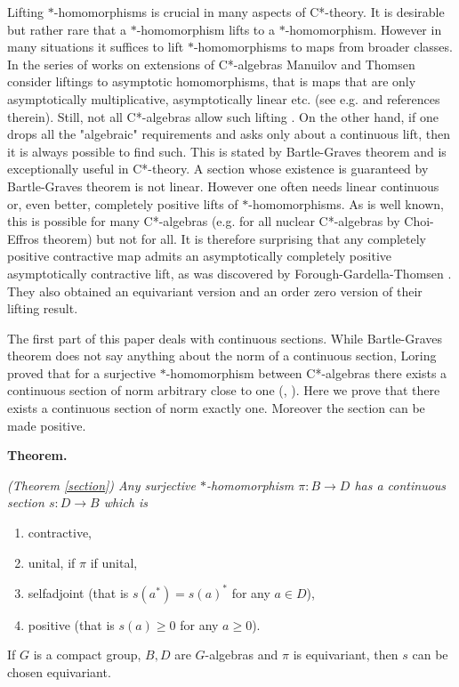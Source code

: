 \documentclass{article}%
\begin{document}
Lifting $\ast$-homomorphisms is crucial in many aspects of  C*-theory.  It is desirable but rather rare that a $\ast$-homomorphism lifts to a $\ast$-homomorphism. However in many situations it suffices to lift $\ast$-homomorphisms to maps from broader classes. In the series of works on extensions of C*-algebras Manuilov and Thomsen consider liftings to asymptotic homomorphisms, that is maps that are only asymptotically multiplicative, asymptotically linear etc. (see e.g. \cite{MT15} and references therein).  Still, not all C*-algebras allow such lifting \cite{MT2}.  On the other hand, if one drops all the "algebraic" requirements and asks only about a continuous lift, then it is always possible to find such. This is stated by  Bartle-Graves theorem and is exceptionally useful in C*-theory. A section whose existence is guaranteed by Bartle-Graves theorem is not linear. However  one often needs linear continuous or, even better,  completely positive lifts of $\ast$-homomorphisms. As is well known, this is possible for  many C*-algebras (e.g. for all nuclear C*-algebras by Choi-Effros theorem) but not for all. It is therefore surprising that any completely positive contractive map admits an asymptotically completely positive asymptotically contractive lift, as was discovered by Forough-Gardella-Thomsen \cite{FGT}. They also obtained an equivariant version and  an order zero version of their lifting result.

\medskip

The first part of this paper deals with continuous sections. While Bartle-Graves theorem does not say anything about the norm of a continuous section,  Loring proved  that for a surjective $\ast$-homomorphism between C*-algebras there exists a continuous section of norm arbitrary close to one (\cite{LoringSection}, \cite[Th. 3.2]{Manuilov}). Here we prove that there exists a continuous section of norm exactly one. Moreover the section can be made positive.

\medskip

{\bf Theorem.} {\it (Theorem \ref{section}) Any surjective $\ast$-homomorphism $\pi: B \to D$ has a continuous section $s: D \to B$ which is
\begin{enumerate}

\item  contractive,

\item  unital, if $\pi$ if unital,

\item selfadjoint (that is $s(a^*) = s(a)^*$ for any $a\in D$),

\item positive (that is $s(a)\ge 0$ for any $a\ge 0$).
\end{enumerate}

\noindent If $G$ is  a compact group, $B, D$ are $G$-algebras and $\pi$ is equivariant, then $s$  can be chosen equivariant.
}
\end{document}
